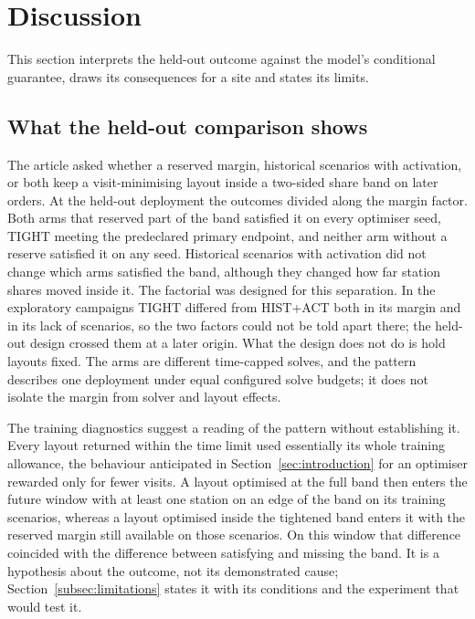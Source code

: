 \section{Discussion}\label{sec:discussion}
This section interprets the held-out outcome against the model's conditional guarantee, draws its consequences for a site and states its limits.

\subsection{What the held-out comparison shows}\label{subsec:interpretation}
The article asked whether a reserved margin, historical scenarios with activation, or both keep a visit-minimising layout inside a two-sided share band on later orders. At the held-out deployment the outcomes divided along the margin factor. Both arms that reserved part of the band satisfied it on every optimiser seed, TIGHT meeting the predeclared primary endpoint, and neither arm without a reserve satisfied it on any seed. Historical scenarios with activation did not change which arms satisfied the band, although they changed how far station shares moved inside it. The factorial was designed for this separation. In the exploratory campaigns TIGHT differed from HIST+ACT both in its margin and in its lack of scenarios, so the two factors could not be told apart there; the held-out design crossed them at a later origin. What the design does not do is hold layouts fixed. The arms are different time-capped solves, and the pattern describes one deployment under equal configured solve budgets; it does not isolate the margin from solver and layout effects.

The training diagnostics suggest a reading of the pattern without establishing it. Every layout returned within the time limit used essentially its whole training allowance, the behaviour anticipated in Section~\ref{sec:introduction} for an optimiser rewarded only for fewer visits. A layout optimised at the full band then enters the future window with at least one station on an edge of the band on its training scenarios, whereas a layout optimised inside the tightened band enters it with the reserved margin still available on those scenarios. On this window that difference coincided with the difference between satisfying and missing the band. It is a hypothesis about the outcome, not its demonstrated cause; Section~\ref{subsec:limitations} states it with its conditions and the experiment that would test it.

